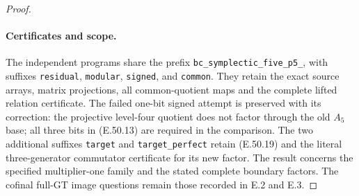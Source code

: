 \begin{proof}
\paragraph{Certificates and scope.}
The independent programs share the prefix
\texttt{bc\_symplectic\_five\_p5\_}, with
suffixes \texttt{residual}, \texttt{modular},
\texttt{signed}, and \texttt{common}.
They retain the exact source arrays,
matrix projections, all common-quotient
maps and the complete lifted relation
certificate.  The failed one-bit signed
attempt is preserved with its correction:
the projective level-four quotient does
not factor through the old $A_5$ base;
all three bits in \textup{(E.50.13)}
are required in the comparison.
The two additional suffixes \texttt{target}
and \texttt{target\_perfect} retain
\textup{(E.50.19)} and the literal three-generator
commutator certificate for its new factor.
The result concerns the specified
multiplier-one family and the stated
complete boundary factors.  The cofinal
full-GT image questions remain those
recorded in E.2 and E.3.
\end{proof}
